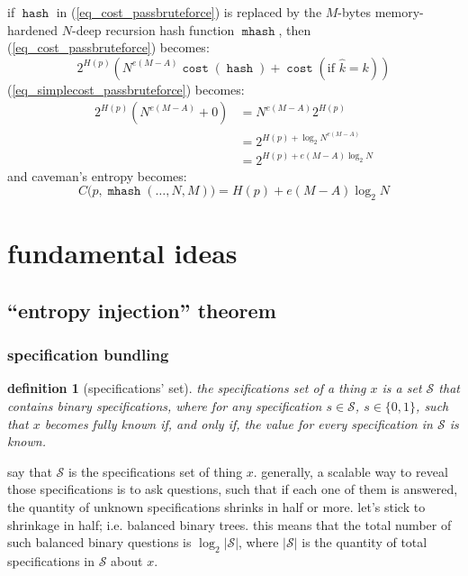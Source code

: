 \documentclass[twocolumn]{article}
\newtheorem{definition}{definition}
\DeclareMathOperator{\hash}{\mathtt{hash}}
\DeclareMathOperator{\mhash}{\mathtt{mhash}}
\DeclareMathOperator{\cost}{\mathtt{cost}}
\begin{document}
if $\hash$ in (\ref{eq_cost_passbruteforce}) is replaced by the $M$-bytes
memory-hardened $N$-deep recursion hash function $\mhash$, then
(\ref{eq_cost_passbruteforce}) becomes:
\begin{equation}\label{eq_cost_passbruteforce_NM}
    2^{H(p)} \left(
        N^{e(M-A)}\cost(\hash) + \cost(\text{if } \hat k = k)
    \right)
\end{equation}
(\ref{eq_simplecost_passbruteforce}) becomes:
\begin{equation}\label{eq_simplecost_passbruteforce_NM}
    \begin{split}
    2^{H(p)} (N^{e(M-A)}+0) &= N^{e(M-A)} 2^{H(p)} \\
                  &= 2^{H(p) + \log_2 N^{e(M-A)}} \\
                  &= 2^{H(p) + e(M-A)\log_2 N}
    \end{split}
\end{equation}
and caveman's entropy becomes:
\begin{equation}
    C\Big(p, \mhash(\ldots, N, M)\Big) = H(p) + e(M-A)\log_2 N
\end{equation}

\section{fundamental ideas}

\subsection{``entropy injection'' theorem}
\subsubsection{specification bundling}
\begin{definition}[specifications' set]
    the specifications set of a thing $x$ is a set $\mathcal{S}$ that
    contains binary specifications, where for any specification $s \in
    \mathcal{S}$, $s \in \{0,1\}$, such that $x$ becomes fully known if,
    and only if, the value for every specification in $\mathcal{S}$ is
    known.
\end{definition}

say that $\mathcal{S}$ is the specifications set of thing $x$.  generally,
a scalable way to reveal those specifications is to ask questions, such
that if each one of them is answered, the quantity of unknown
specifications shrinks in half or more.  let's stick to shrinkage in half;
i.e. balanced binary trees.  this means that the total number of such
balanced binary questions is $\log_2 |\mathcal{S}|$, where $|\mathcal{S}|$
is the quantity of total specifications in $\mathcal{S}$ about $x$.
\end{document}
